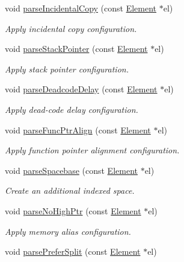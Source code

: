 \begin{DoxyCompactItemize}
void \mbox{\hyperlink{class_architecture_a8b2290f8d9cf479d4b49fb26c83ff8c5}{parse\+Incidental\+Copy}} (const \mbox{\hyperlink{class_element}{Element}} $\ast$el)
\begin{DoxyCompactList}\small\item\em Apply incidental copy configuration. \end{DoxyCompactList}\item 
void \mbox{\hyperlink{class_architecture_aac48da0d464ff216982db607b43d4757}{parse\+Stack\+Pointer}} (const \mbox{\hyperlink{class_element}{Element}} $\ast$el)
\begin{DoxyCompactList}\small\item\em Apply stack pointer configuration. \end{DoxyCompactList}\item 
void \mbox{\hyperlink{class_architecture_a29ad4de633bc630b03425ab46b31f42b}{parse\+Deadcode\+Delay}} (const \mbox{\hyperlink{class_element}{Element}} $\ast$el)
\begin{DoxyCompactList}\small\item\em Apply dead-\/code delay configuration. \end{DoxyCompactList}\item 
void \mbox{\hyperlink{class_architecture_a5e10589073ea41018047b8affb10025e}{parse\+Func\+Ptr\+Align}} (const \mbox{\hyperlink{class_element}{Element}} $\ast$el)
\begin{DoxyCompactList}\small\item\em Apply function pointer alignment configuration. \end{DoxyCompactList}\item 
void \mbox{\hyperlink{class_architecture_adf3b1aecaff0ca84c647ddbe6e25de5c}{parse\+Spacebase}} (const \mbox{\hyperlink{class_element}{Element}} $\ast$el)
\begin{DoxyCompactList}\small\item\em Create an additional indexed space. \end{DoxyCompactList}\item 
void \mbox{\hyperlink{class_architecture_a6f51fadb288b36927fa9dfda725ffd88}{parse\+No\+High\+Ptr}} (const \mbox{\hyperlink{class_element}{Element}} $\ast$el)
\begin{DoxyCompactList}\small\item\em Apply memory alias configuration. \end{DoxyCompactList}\item 
void \mbox{\hyperlink{class_architecture_a7cbe749d5bcc143838f2590fc08acf26}{parse\+Prefer\+Split}} (const \mbox{\hyperlink{class_element}{Element}} $\ast$el)

\end{DoxyCompactItemize}
